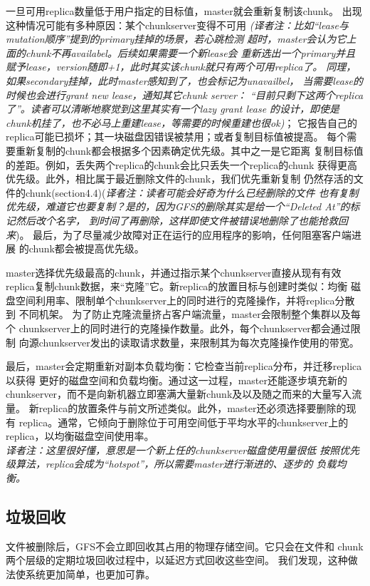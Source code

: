 一旦可用replica数量低于用户指定的目标值，master就会重新复制该chunk。
出现这种情况可能有多种原因：某个chunkserver变得不可用
\emph{(译者注：比如“lease与mutation顺序”提到的primary挂掉的场景，若心跳检测
超时，master会认为它上面的chunk不再availabel。后续如果需要一个新lease会
重新选出一个primary并且赋予lease，version随即+1，此时其实该chunk就只有两个可用replica了。
同理，如果secondary挂掉，此时master感知到了，也会标记为unavailbel，
当需要lease的时候也会进行grant new lease，通知其它chunk server：
“目前只剩下这两个replica了”。读者可以清晰地察觉到这里其实有一个lazy grant lease
的设计，即使是chunk机挂了，也不必马上重建lease，等需要的时候重建也很ok)}；
它报告自己的replica可能已损坏；其一块磁盘因错误被禁用；或者复制目标值被提高。
每个需要重新复制的chunk都会根据多个因素确定优先级。其中之一是它距离
复制目标值的差距。例如，丢失两个replica的chunk会比只丢失一个replica的chunk
获得更高优先级。此外，相比属于最近删除文件的chunk，我们优先重新复制
仍然存活的文件的chunk(section4.4)(\emph{译者注：读者可能会好奇为什么已经删除的文件
也有复制优先级，难道它也要复制？是的，因为GFS的删除其实是给一个“Deleted At”的标记然后改个名字，
到时间了再删除，这样即使文件被错误地删除了也能抢救回来})。
最后，为了尽量减少故障对正在运行的应用程序的影响，任何阻塞客户端进展
的chunk都会被提高优先级。

master选择优先级最高的chunk，并通过指示某个chunkserver直接从现有有效
replica复制chunk数据，来“克隆”它。新replica的放置目标与创建时类似：均衡
磁盘空间利用率、限制单个chunkserver上的同时进行的克隆操作，并将replica分散到
不同机架。
为了防止克隆流量挤占客户端流量，master会限制整个集群以及每个
chunkserver上的同时进行的克隆操作数量。此外，每个chunkserver都会通过限制
向源chunkserver发出的读取请求数量，来限制其为每次克隆操作使用的带宽。

最后，master会定期重新对副本负载均衡：它检查当前replica分布，并迁移replica以获得
更好的磁盘空间和负载均衡。通过这一过程，master还能逐步填充新的
chunkserver，而不是向新机器立即塞满大量新chunk及以及随之而来的大量写入流量。
新replica的放置条件与前文所述类似。此外，master还必须选择要删除的现有
replica。通常，它倾向于删除位于可用空间低于平均水平的chunkserver上的
replica，以均衡磁盘空间使用率。
\\\emph{译者注：这里很好懂，意思是一个新上任的chunkserver磁盘使用量很低
按照优先级算法，replica会成为“hotspot”，所以需要master进行渐进的、逐步的
负载均衡。}

\subsection{垃圾回收}
文件被删除后，GFS不会立即回收其占用的物理存储空间。它只会在文件和
chunk两个层级的定期垃圾回收过程中，以延迟方式回收这些空间。
我们发现，这种做法使系统更加简单，也更加可靠。

